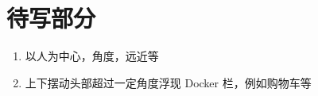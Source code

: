 \chapter{待写部分}

\begin{enumerate}
\item{以人为中心，角度，远近等}
\item{上下摆动头部超过一定角度浮现 Docker 栏，例如购物车等}
\end{enumerate}